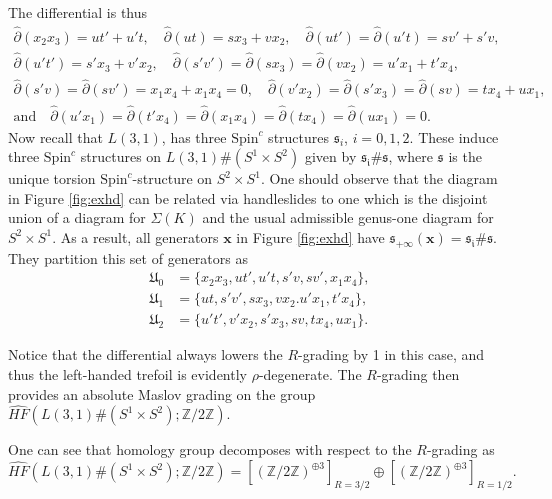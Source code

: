 \documentclass[11pt]{article}
\theoremstyle{plain} \newtheorem{thm}{Theorem}[subsection]
\theoremstyle{plain} \newtheorem{cor}[thm]{Corollary}
\theoremstyle{plain} \newtheorem{prop}[thm]{Proposition}
\theoremstyle{plain} \newtheorem{conj}[thm]{Conjecture}
\theoremstyle{plain} \newtheorem{lem}[thm]{Lemma}
\theoremstyle{definition} \newtheorem{df}[thm]{Definition}
\theoremstyle{remark} \newtheorem{rmk}[thm]{Remark}
\theoremstyle{remark} \newtheorem{obs}[thm]{Observation}
\newcommand{\SxS}{S^{2}\times S^{1}}
\newcommand{\DBC}[1]{\Sigma(#1)}
\newcommand{\SUM}[1]{#1 \#(S^{1}\times S^{2})}
\newcommand{\bx}{\mathbf{x}}
\newcommand{\Zcaltwo}{\mathbb{Z}/2\mathbb{Z}}
\begin{document}
The differential is thus
\begin{gather*}
\widehat{\partial}(x_{2}x_{3}) = ut' + u't, \quad
\widehat{\partial}(ut) = sx_{3} + vx_{2}, \quad
\widehat{\partial}(ut') =  \widehat{\partial}(u't) = sv' + s'v,\\
\widehat{\partial}(u't') = s'x_{3} + v'x_{2}, \quad
\widehat{\partial}(s'v') = \widehat{\partial}(sx_{3}) = \widehat{\partial}(vx_{2}) = u'x_{1} + t'x_{4},\\\widehat{\partial}(s'v) = \widehat{\partial}(sv') = x_{1}x_{4} + x_{1}x_{4} = 0, \quad
\widehat{\partial}(v'x_{2}) = \widehat{\partial}(s'x_{3}) = \widehat{\partial}(sv) = tx_{4} + ux_{1},\\
\text{and} \quad \widehat{\partial}(u'x_{1}) = \widehat{\partial}(t'x_{4}) = \widehat{\partial}(x_{1}x_{4}) = \widehat{\partial}(tx_{4}) = \widehat{\partial}(ux_{1}) = 0.
\end{gather*}
Now recall that $L(3,1)$, has three $\text{Spin}^{c}$ structures $\mathfrak{s}_{i}$, $i = 0, 1, 2$.  These induce three $\text{Spin}^{c}$ structures on $\SUM{L(3,1)}$ given by $\mathfrak{s_{i}} \# \mathfrak{s}$, where $\mathfrak{s}$ is the unique torsion $\text{Spin}^{c}$-structure on $S^{2} \times S^{1}$.  One should observe that the diagram in Figure \ref{fig:exhd} can be related via handleslides to one which is the disjoint union of a diagram for $\DBC{K}$ and the usual admissible genus-one diagram for $\SxS$.  As a result, all generators $\bx$ in Figure \ref{fig:exhd} have $\mathfrak{s}_{+\infty}(\bx) = \mathfrak{s_{i}} \# \mathfrak{s}$.  They partition this set of generators as
\begin{align*}
\mathfrak{U}_{0} &= \{ x_{2}x_{3}, ut', u't, s'v, sv', x_{1}x_{4} \}, \\
\mathfrak{U}_{1} &= \{ ut, s'v', sx_{3}, vx_{2}. u'x_{1}, t'x_{4} \}, \\
\mathfrak{U}_{2} &= \{ u't', v'x_{2}, s'x_{3}, sv, tx_{4}, ux_{1} \}.
\end{align*}

Notice that the differential always lowers the $R$-grading by 1 in this case, and thus the left-handed trefoil is evidently $\rho$-degenerate.  The $R$-grading then provides an absolute Maslov grading on the group $\widehat{HF}(\SUM{L(3,1)}; \Zcaltwo)$.

One can see that homology group decomposes with respect to the $R$-grading as
\begin{equation*}
\widehat{HF}(\SUM{L(3,1)}; \Zcaltwo) = \left[ \left( \Zcaltwo \right)^{\oplus 3} \right] _{R = 3/2} \oplus\left[ \left( \Zcaltwo \right)^{\oplus 3} \right] _{R = 1/2}.
\end{equation*}
\end{document}
